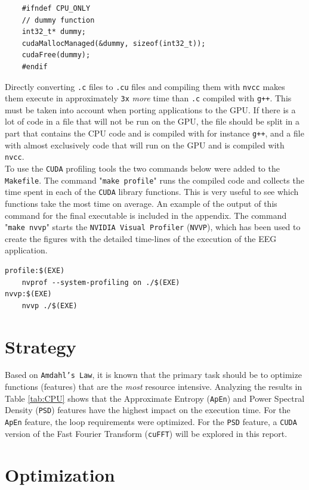 \documentclass[a4paper]{article}
\begin{document}
\begin{lstlisting}
    #ifndef CPU_ONLY
    // dummy function
    int32_t* dummy;
    cudaMallocManaged(&dummy, sizeof(int32_t));
    cudaFree(dummy);
    #endif
\end{lstlisting}

\noindent Directly converting \texttt{.c} files to \texttt{.cu} files and compiling them with \texttt{nvcc} makes them execute in approximately \texttt{3x} \textit{more} time than \texttt{.c} compiled with \texttt{g++}. This must be taken into account when porting applications to the GPU. If there is a lot of code in a file that will not be run on the GPU, the file should be split in a part that contains the CPU code and is compiled with for instance \texttt{g++}, and a file with almost exclusively code that will run on the GPU and is compiled with \texttt{nvcc}.
\\

\noindent To use the \texttt{CUDA} profiling tools the two commands below were added to the \texttt{Makefile}. The command "\texttt{make profile}" runs the compiled code and collects the time spent in each of the \texttt{CUDA} library functions. This is very useful to see which functions take the most time on average. An example of the output of this command for the final executable is included in the appendix.
The command "\texttt{make nvvp}" starts the \texttt{NVIDIA Visual Profiler} (\texttt{NVVP}), which has been used to create the figures with the detailed time-lines of the execution of the EEG application.
\begin{lstlisting}
profile:$(EXE)
	nvprof --system-profiling on ./$(EXE)
nvvp:$(EXE)
	nvvp ./$(EXE)
\end{lstlisting}

\section{Strategy}
Based on \texttt{Amdahl's Law}, it is known that the primary task should be to optimize functions (features) that are the \textit{most} resource intensive. Analyzing the results in Table \ref{tab:CPU} shows that the Approximate Entropy (\texttt{ApEn}) and Power Spectral Density (\texttt{PSD}) features have the highest impact on the execution time. For the \texttt{ApEn} feature, the loop requirements were optimized. For the \texttt{PSD} feature, a \texttt{CUDA} version of the Fast Fourier Transform (\texttt{cuFFT}) will be explored in this report.

\section{Optimization}
\end{document}
